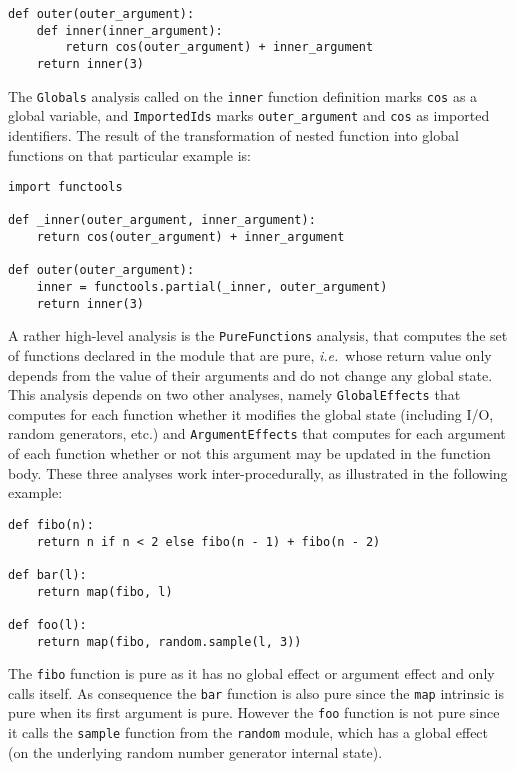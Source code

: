 \documentclass[10pt, onecolumn, preprint]{sigplanconf}
\providecommand{\ie}[1][~]{\textit{i.e.}#1}
\begin{document}
\begin{lstlisting}
def outer(outer_argument):
    def inner(inner_argument):
        return cos(outer_argument) + inner_argument
    return inner(3)
\end{lstlisting}

The \texttt{Globals} analysis called on the \texttt{inner} function definition
marks \texttt{cos} as a global variable, and \texttt{ImportedIds} marks
\texttt{outer\_argument} and \texttt{cos} as imported identifiers. The result
of the transformation of nested function into global functions on that
particular example is:

\begin{lstlisting}
import functools

def _inner(outer_argument, inner_argument):
    return cos(outer_argument) + inner_argument

def outer(outer_argument):
    inner = functools.partial(_inner, outer_argument)
    return inner(3)
\end{lstlisting}

A rather high-level analysis is the \texttt{PureFunctions} analysis, that computes the
set of functions declared in the module that are pure, \ie{whose return value
only depends from the value of their arguments and do not change any global state}.
This analysis depends on two
other analyses, namely \texttt{GlobalEffects} that computes for each function whether
it modifies the global state (including I/O, random generators, etc.)
and \texttt{ArgumentEffects} that computes for each argument of each function 
whether or not this argument may be updated in the function body. These three
analyses work inter-procedurally, as illustrated in the following example:

\begin{lstlisting}
def fibo(n):
    return n if n < 2 else fibo(n - 1) + fibo(n - 2)

def bar(l):
    return map(fibo, l)

def foo(l):
    return map(fibo, random.sample(l, 3))
\end{lstlisting}

The \texttt{fibo} function is pure as it has no global effect or argument effect and
only calls itself. As consequence the \texttt{bar} function is also pure since the
\texttt{map} intrinsic is pure when its first argument is pure. However the \texttt{foo}
function is not pure since it calls the \texttt{sample} function from the \texttt{random}
module, which has a global effect (on the underlying random number generator
internal state).
\end{document}
